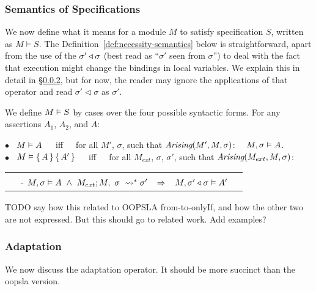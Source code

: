  


\subsubsection{Semantics of \Nec Specifications}
We now  define what it means for  a module  $M$ to satisfy specification  $S$, written as $M \vDash S$. The
 Definition~\ref{def:necessity-semantics} below is straightforward, apart from  
the use of the $\sigma' \triangleleft \sigma$  (best read as ``$\sigma'$ seen
from $\sigma$'')
to deal with the fact that execution might  change the bindings in local variables.
We explain this in detail in   \S \ref{sub:adapt:full}, but for now, the reader may ignore the applications of that operator and
read $\sigma' \triangleleft \sigma$ as $\sigma'$.

\begin{definition}
We define $M \vDash {S}$ by cases over the four possible syntactic forms.
For any assertions   $A_1$, $A_2$, and $A$: \\

\label{def:necessity-semantics}

$\bullet$ \ $M \vDash {A}$\  \ \ iff\ \ \ for all $M'$, $\sigma$, such that $\textit{Arising}(M', M, \sigma)$: \ \  $M , \sigma \vDash A$.  \\

$\bullet$ \ $M \vDash {\{}\, A \,{\}} \, {\{}\, A'\, {\}} $\ \ \ iff\ \  \ for all $M_{ext}$, $\sigma$, $\sigma'$, such that $\textit{Arising}(M_{ext}, M, \sigma)$: \\  

\begin{tabular}{lr}
$\;\;\;\;$- $\satisfiesA{M}{\sigma}{A}\  \wedge \ \reductions{M_{ext}}{M}{\sigma}{\sigma'} \;\;\;\Rightarrow\;\;\; \satisfiesA{M}{\sigma' \triangleleft \sigma}{A'}$   
\end{tabular} 


 
\end{definition} 

TODO say how this related to OOPSLA from-to-onlyIf, and how the other two are not expressed. But this should go to related work.
Add examples?

\newpage
\subsubsection{Adaptation}
\label{sub:adapt:full}
We  now discuss  the adaptation operator.  It should be more succinct than the oopsla version.
 


